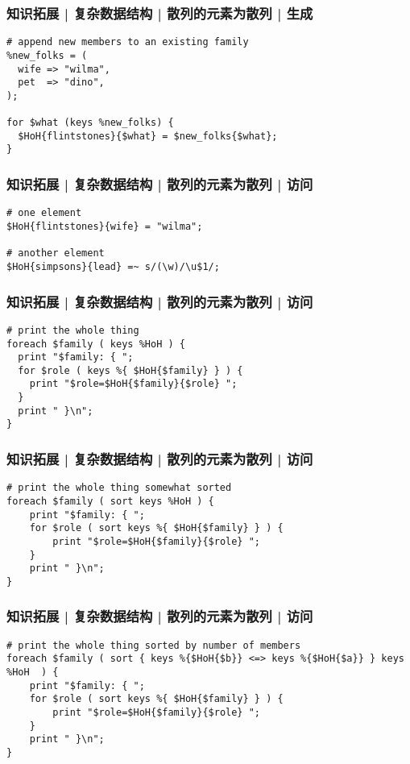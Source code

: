 \begin{frame}[fragile]
  \frametitle{知识拓展 | 复杂数据结构 | 散列的元素为散列 | 生成}
\begin{lstlisting}
# append new members to an existing family
%new_folks = (
  wife => "wilma",
  pet  => "dino",
);

for $what (keys %new_folks) {
  $HoH{flintstones}{$what} = $new_folks{$what};
}
\end{lstlisting}
\end{frame}

\begin{frame}[fragile]
  \frametitle{知识拓展 | 复杂数据结构 | 散列的元素为散列 | 访问}
\begin{lstlisting}
# one element
$HoH{flintstones}{wife} = "wilma";

# another element
$HoH{simpsons}{lead} =~ s/(\w)/\u$1/;
\end{lstlisting}
\end{frame}

\begin{frame}[fragile]
  \frametitle{知识拓展 | 复杂数据结构 | 散列的元素为散列 | 访问}
\begin{lstlisting}
# print the whole thing
foreach $family ( keys %HoH ) {
  print "$family: { ";
  for $role ( keys %{ $HoH{$family} } ) {
    print "$role=$HoH{$family}{$role} ";
  }
  print " }\n";
}
\end{lstlisting}
\end{frame}

\begin{frame}[fragile]
  \frametitle{知识拓展 | 复杂数据结构 | 散列的元素为散列 | 访问}
\begin{lstlisting}
# print the whole thing somewhat sorted
foreach $family ( sort keys %HoH ) {
    print "$family: { ";
    for $role ( sort keys %{ $HoH{$family} } ) {
        print "$role=$HoH{$family}{$role} ";
    }
    print " }\n";
}
\end{lstlisting}
\end{frame}

\begin{frame}[fragile]
  \frametitle{知识拓展 | 复杂数据结构 | 散列的元素为散列 | 访问}
\begin{lstlisting}
# print the whole thing sorted by number of members
foreach $family ( sort { keys %{$HoH{$b}} <=> keys %{$HoH{$a}} } keys %HoH  ) {
    print "$family: { ";
    for $role ( sort keys %{ $HoH{$family} } ) {
        print "$role=$HoH{$family}{$role} ";
    }
    print " }\n";
}
\end{lstlisting}
\end{frame}

